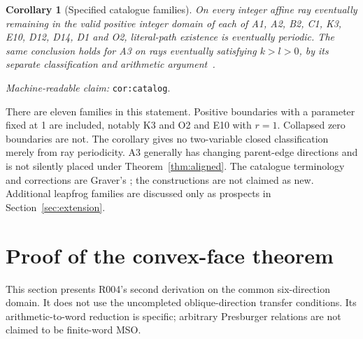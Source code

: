 \documentclass[11pt]{amsart}
\newcommand{\record}[1]{\nolinkurl{#1}}
\newcommand{\claimid}[1]{\par\nopagebreak\noindent\textit{Machine-readable claim:} \record{#1}.\par}
\newtheorem{catalogcor}{Corollary}
\theoremstyle{definition}\newtheorem{definition}{Definition}
\begin{document}
\begin{catalogcor}[Specified catalogue families]\label{cor:catalog}
On every integer affine ray eventually remaining in the valid positive
integer domain of each of A1, A2, B2, C1, K3, E10, D12, D14, D1 and O2,
literal-path existence is eventually periodic. The same conclusion
holds for A3 on rays eventually satisfying $k>l>0$, by its separate
classification and arithmetic argument~\cite{A3}.
\end{catalogcor}
\claimid{cor:catalog}
There are eleven families in this statement. Positive boundaries with
a parameter fixed at 1 are included, notably K3 and O2 and E10 with
$r=1$. Collapsed zero boundaries are not. The corollary gives no
two-variable closed classification merely from ray periodicity.
A3 generally has changing parent-edge directions and is not silently
placed under Theorem~\ref{thm:aligned}. The catalogue terminology and
corrections are Graver's \cite{Graver}; the constructions are not claimed
as new. Additional leapfrog families are discussed only as prospects
in Section~\ref{sec:extension}.

\section{Proof of the convex-face theorem}\label{sec:proof}
This section presents R004's second derivation on the common
six-direction domain. It does not use the uncompleted oblique-direction
transfer conditions. Its arithmetic-to-word reduction is specific;
arbitrary Presburger relations are not claimed to be finite-word MSO.
\end{document}
